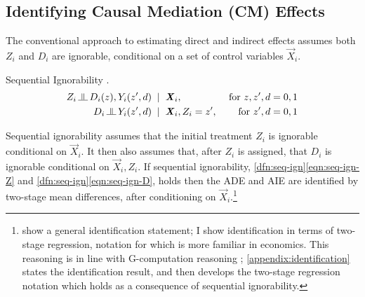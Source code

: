 \subsection{Identifying Causal Mediation (CM) Effects}
The conventional approach to estimating direct and indirect effects assumes both $Z_i$ and $D_i$ are ignorable, conditional on a set of control variables $\vec X_i$.
\begin{definition}
    \label{dfn:seq-ign}
    Sequential Ignorability \citep{imai2010identification}.
    \begin{align}
        \label{eqn:seq-ign-Z}
        Z_i \indep  D_i(z), Y_i(z', d) \;\; &| \;\; \vec X_i,
            &\textnormal{ for } z, z', d = 0, 1 \\
        \label{eqn:seq-ign-D}
        D_i \indep Y_i(z', d) \;\; &| \;\; \vec X_i, Z_i = z', 
            &\textnormal{ for } z', d = 0, 1
    \end{align}
\end{definition}
Sequential ignorability assumes that the initial treatment $Z_i$ is ignorable conditional on $\vec X_i$.
It then also assumes that, after $Z_i$ is assigned, that $D_i$ is ignorable conditional on $\vec X_i, Z_i$.
If sequential ignorability, \ref{dfn:seq-ign}\eqref{eqn:seq-ign-Z} and \ref{dfn:seq-ign}\eqref{eqn:seq-ign-D}, holds then the ADE and AIE are identified by two-stage mean differences, after conditioning on $\vec X_i$.\footnote{
    \cite{imai2010identification} show a general identification statement; I show identification in terms of two-stage regression, notation for which is more familiar in economics.
    This reasoning is in line with G-computation reasoning \citep{robins1986g};
    \autoref{appendix:identification} states the \cite{imai2010identification} identification result, and then develops the two-stage regression notation which holds as a consequence of sequential ignorability.
}
\vspace{0.1cm}

